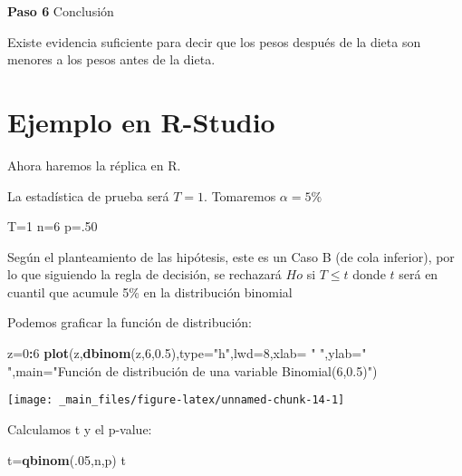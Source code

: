 \documentclass[a4paper,oneside,openany]{book}
\newenvironment{Shaded}{\begin{snugshade}}{\end{snugshade}}
\newcommand{\KeywordTok}[1]{\textcolor[rgb]{0.13,0.29,0.53}{\textbf{#1}}}
\newcommand{\DataTypeTok}[1]{\textcolor[rgb]{0.13,0.29,0.53}{#1}}
\newcommand{\DecValTok}[1]{\textcolor[rgb]{0.00,0.00,0.81}{#1}}
\newcommand{\FloatTok}[1]{\textcolor[rgb]{0.00,0.00,0.81}{#1}}
\newcommand{\StringTok}[1]{\textcolor[rgb]{0.31,0.60,0.02}{#1}}
\newcommand{\OperatorTok}[1]{\textcolor[rgb]{0.81,0.36,0.00}{\textbf{#1}}}
\newcommand{\NormalTok}[1]{#1}
\begin{document}
\textbf{Paso 6} Conclusión

Existe evidencia suficiente para decir que los pesos después de la dieta
son menores a los pesos antes de la dieta.

\section{Ejemplo en R-Studio}\label{ejemplo-en-r-studio-2}

Ahora haremos la réplica en R.

La estadística de prueba será \(T=1\). Tomaremos \(\alpha=5\%\)

\begin{Shaded}
\begin{Highlighting}[]
\NormalTok{T=}\DecValTok{1}
\NormalTok{n=}\DecValTok{6}
\NormalTok{p=.}\DecValTok{50}
\end{Highlighting}
\end{Shaded}

Según el planteamiento de las hipótesis, este es un Caso B (de cola
inferior), por lo que siguiendo la regla de decisión, se rechazará
\(Ho\) si \(T\leq t\) donde \(t\) será en cuantil que acumule 5\% en la
distribución binomial

Podemos graficar la función de distribución:

\begin{Shaded}
\begin{Highlighting}[]
\NormalTok{z=}\DecValTok{0}\OperatorTok{:}\DecValTok{6}
\KeywordTok{plot}\NormalTok{(z,}\KeywordTok{dbinom}\NormalTok{(z,}\DecValTok{6}\NormalTok{,}\FloatTok{0.5}\NormalTok{),}\DataTypeTok{type=}\StringTok{"h"}\NormalTok{,}\DataTypeTok{lwd=}\DecValTok{8}\NormalTok{,}\DataTypeTok{xlab=} \StringTok{" "}\NormalTok{,}\DataTypeTok{ylab=}\StringTok{" "}\NormalTok{,}\DataTypeTok{main=}\StringTok{"Función de distribución de una variable Binomial(6,0.5)"}\NormalTok{)}
\end{Highlighting}
\end{Shaded}

\begin{center}\texttt{[image: \_main\_files/figure-latex/unnamed-chunk-14-1]} \end{center}

Calculamos t y el p-value:

\begin{Shaded}
\begin{Highlighting}[]
\NormalTok{t=}\KeywordTok{qbinom}\NormalTok{(.}\DecValTok{05}\NormalTok{,n,p)}
\NormalTok{t}
\end{Highlighting}
\end{Shaded}
\end{document}

